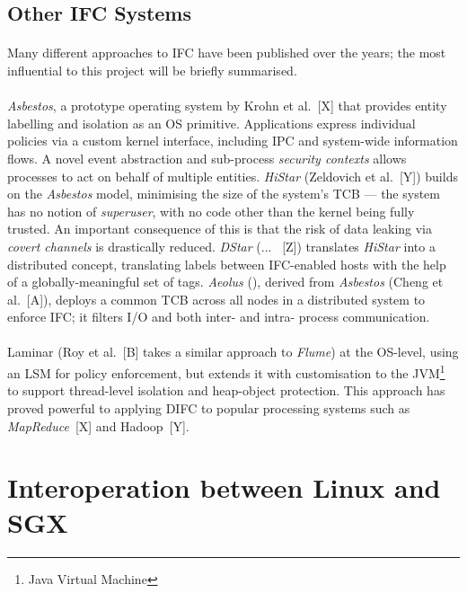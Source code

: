 \subsection{Other IFC Systems}
\paragraph{} Many different approaches to IFC have been published over the years; the most influential to this project will be briefly summarised.

\paragraph{} \textit{Asbestos}, a prototype operating system by Krohn et al.~[X] that provides entity labelling and isolation as an OS primitive. Applications express individual policies via a custom kernel interface, including IPC and system-wide information flows. A novel event abstraction and sub-process \textit{security contexts} allows processes to act on behalf of multiple entities. \textit{HiStar} (Zeldovich et al.~[Y]) builds on the \textit{Asbestos} model, minimising the size of the system's TCB --- the system has no notion of \textit{superuser}, with no code other than the kernel being fully trusted. An important consequence of this is that the risk of data leaking via \textit{covert channels} is drastically reduced. \textit{DStar} (... ~[Z]) translates \textit{HiStar} into a distributed concept, translating labels between IFC-enabled hosts with the help of a globally-meaningful set of tags. \textit{Aeolus} (), derived from \textit{Asbestos} (Cheng et al.~[A]), deploys a common TCB across all nodes in a distributed system to enforce IFC; it filters I/O and both inter- and intra- process communication.

\paragraph{} Laminar (Roy et al.~[B] takes a similar approach to \textit{Flume}) at the OS-level, using an LSM for policy enforcement, but extends it with customisation to the JVM\footnote{Java Virtual Machine} to support thread-level isolation and heap-object protection. This approach has proved powerful to applying DIFC to popular processing systems such as \textit{MapReduce}~[X] and Hadoop~[Y].


\section{Interoperation between Linux and SGX} 
